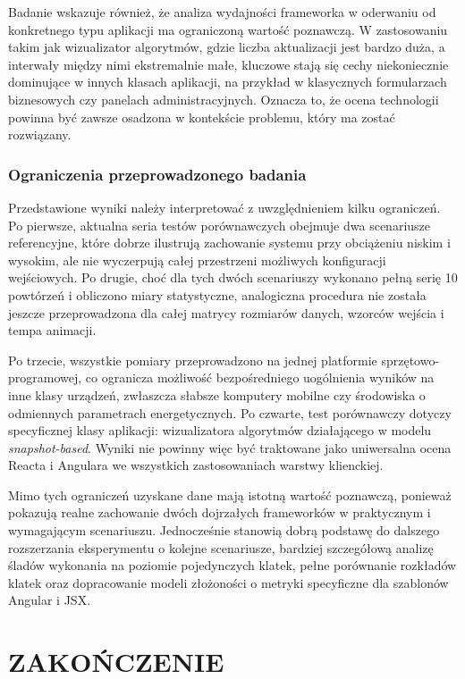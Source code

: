 \documentclass[12pt,openright,twoside]{report}
\begin{document}
Badanie wskazuje również, że analiza wydajności frameworka w oderwaniu od konkretnego typu aplikacji ma ograniczoną wartość poznawczą. W zastosowaniu takim jak wizualizator algorytmów, gdzie liczba aktualizacji jest bardzo duża, a interwały między nimi ekstremalnie małe, kluczowe stają się cechy niekoniecznie dominujące w innych klasach aplikacji, na przykład w klasycznych formularzach biznesowych czy panelach administracyjnych. Oznacza to, że ocena technologii powinna być zawsze osadzona w kontekście problemu, który ma zostać rozwiązany.

\subsection{Ograniczenia przeprowadzonego badania}
Przedstawione wyniki należy interpretować z uwzględnieniem kilku ograniczeń. Po pierwsze, aktualna seria testów porównawczych obejmuje dwa scenariusze referencyjne, które dobrze ilustrują zachowanie systemu przy obciążeniu niskim i wysokim, ale nie wyczerpują całej przestrzeni możliwych konfiguracji wejściowych. Po drugie, choć dla tych dwóch scenariuszy wykonano pełną serię 10 powtórzeń i obliczono miary statystyczne, analogiczna procedura nie została jeszcze przeprowadzona dla całej matrycy rozmiarów danych, wzorców wejścia i tempa animacji.

Po trzecie, wszystkie pomiary przeprowadzono na jednej platformie sprzętowo-programowej, co ogranicza możliwość bezpośredniego uogólnienia wyników na inne klasy urządzeń, zwłaszcza słabsze komputery mobilne czy środowiska o odmiennych parametrach energetycznych. Po czwarte, test porównawczy dotyczy specyficznej klasy aplikacji: wizualizatora algorytmów działającego w modelu \textit{snapshot-based}. Wyniki nie powinny więc być traktowane jako uniwersalna ocena Reacta i Angulara we wszystkich zastosowaniach warstwy klienckiej.

Mimo tych ograniczeń uzyskane dane mają istotną wartość poznawczą, ponieważ pokazują realne zachowanie dwóch dojrzałych frameworków w praktycznym i wymagającym scenariuszu. Jednocześnie stanowią dobrą podstawę do dalszego rozszerzania eksperymentu o kolejne scenariusze, bardziej szczegółową analizę śladów wykonania na poziomie pojedynczych klatek, pełne porównanie rozkładów klatek oraz dopracowanie modeli złożoności o metryki specyficzne dla szablonów Angular i JSX.

\chapter*{ZAKOŃCZENIE}
\end{document}
